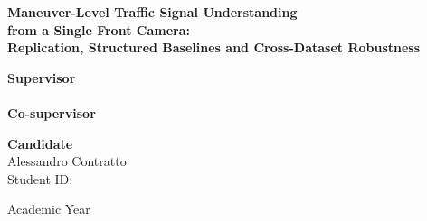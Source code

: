 \begin{titlepage}
\centering
{\Large \textsc{}\par}
\vspace{0.4cm}
{\large {}\par}
\vspace{0.2cm}
{\large {}\par}

\vspace{2.5cm}
{\LARGE \bfseries Maneuver-Level Traffic Signal Understanding\\[0.2cm]
from a Single Front Camera:\\[0.2cm]
Replication, Structured Baselines and Cross-Dataset Robustness\par}

\vspace{2.5cm}
\begin{minipage}[t]{0.47\textwidth}
\raggedright
\textbf{Supervisor}\\
\\[0.4cm]
\textbf{Co-supervisor}\\
\end{minipage}\hfill
\begin{minipage}[t]{0.47\textwidth}
\raggedleft
\textbf{Candidate}\\
Alessandro Contratto\\
Student ID: 
\end{minipage}

\vfill
{\large Academic Year \par}
\end{titlepage}
